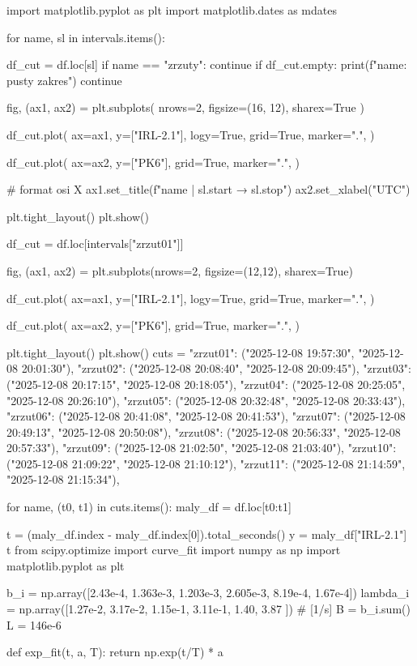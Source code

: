 \begin{python}
import matplotlib.pyplot as plt
import matplotlib.dates as mdates

for name, sl in intervals.items():

df_cut = df.loc[sl]
if name == "zrzuty":
continue
if df_cut.empty:
print(f"{name}: pusty zakres")
continue

fig, (ax1, ax2) = plt.subplots(
nrows=2,
figsize=(16, 12),
sharex=True
)


df_cut.plot(
ax=ax1,
y=["IRL-2.1"],
logy=True,
grid=True,
marker=".",
)


df_cut.plot(
ax=ax2,
y=["PK6"],
grid=True,
marker=".",
)

# format osi X
ax1.set_title(f"{name} | {sl.start} → {sl.stop}")
ax2.set_xlabel("UTC")

plt.tight_layout()
plt.show()

df_cut = df.loc[intervals["zrzut01"]]

fig, (ax1, ax2) = plt.subplots(nrows=2, figsize=(12,12), sharex=True)

df_cut.plot(
ax=ax1,
y=["IRL-2.1"],
logy=True,
grid=True,
marker=".",
)

df_cut.plot(
ax=ax2,
y=["PK6"],
grid=True,
marker=".",
)

plt.tight_layout()
plt.show()
cuts = {
	"zrzut01": ("2025-12-08 19:57:30", "2025-12-08 20:01:30"),
	"zrzut02": ("2025-12-08 20:08:40", "2025-12-08 20:09:45"),
	"zrzut03": ("2025-12-08 20:17:15", "2025-12-08 20:18:05"),
	"zrzut04": ("2025-12-08 20:25:05", "2025-12-08 20:26:10"),
	"zrzut05": ("2025-12-08 20:32:48", "2025-12-08 20:33:43"),
	"zrzut06": ("2025-12-08 20:41:08", "2025-12-08 20:41:53"),
	"zrzut07": ("2025-12-08 20:49:13", "2025-12-08 20:50:08"),
	"zrzut08": ("2025-12-08 20:56:33", "2025-12-08 20:57:33"),
	"zrzut09": ("2025-12-08 21:02:50", "2025-12-08 21:03:40"),
	"zrzut10": ("2025-12-08 21:09:22", "2025-12-08 21:10:12"),
	"zrzut11": ("2025-12-08 21:14:59", "2025-12-08 21:15:34"),
}

for name, (t0, t1) in cuts.items():
maly_df = df.loc[t0:t1]

t = (maly_df.index - maly_df.index[0]).total_seconds()
y = maly_df["IRL-2.1"]
t
from scipy.optimize import curve_fit
import numpy as np
import matplotlib.pyplot as plt

b_i   = np.array([2.43e-4, 1.363e-3, 1.203e-3, 2.605e-3, 8.19e-4, 1.67e-4])
lambda_i = np.array([1.27e-2, 3.17e-2, 1.15e-1, 3.11e-1, 1.40,   3.87   ])  # [1/s]
B = b_i.sum()
L = 146e-6

def exp_fit(t, a, T):
return np.exp(t/T) * a   


\end{python}
